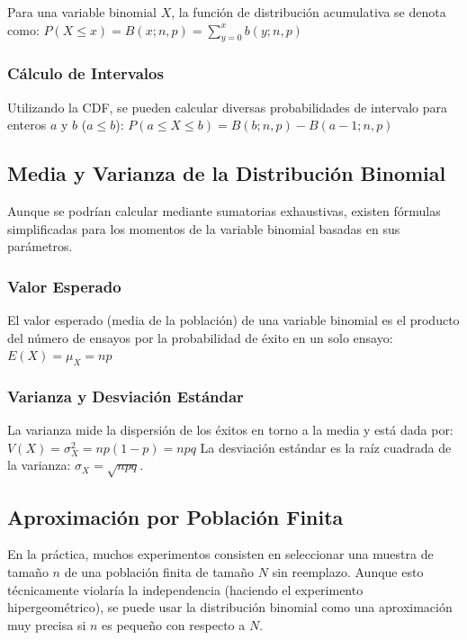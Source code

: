 \documentclass[a4paper]{article}
\begin{document}
Para una variable binomial $X$, la función de distribución acumulativa se denota como:
$P(X \leq x) = B(x; n, p) = \sum_{y=0}^{x} b(y; n, p)$

\subsubsection{Cálculo de Intervalos}

Utilizando la CDF, se pueden calcular diversas probabilidades de intervalo para enteros $a$ y $b$ ($a \leq b$):
$P(a \leq X \leq b) = B(b; n, p) - B(a - 1; n, p)$

\subsection{Media y Varianza de la Distribución Binomial}

Aunque se podrían calcular mediante sumatorias exhaustivas, existen fórmulas simplificadas para los momentos de la variable binomial basadas en sus parámetros.

\subsubsection{Valor Esperado}

El valor esperado (media de la población) de una variable binomial es el producto del número de ensayos por la probabilidad de éxito en un solo ensayo:
$E(X) = \mu_X = np$

\subsubsection{Varianza y Desviación Estándar}

La varianza mide la dispersión de los éxitos en torno a la media y está dada por:
$V(X) = \sigma^2_X = np(1 - p) = npq$
La desviación estándar es la raíz cuadrada de la varianza: $\sigma_X = \sqrt{npq}$.

\subsection{Aproximación por Población Finita}

En la práctica, muchos experimentos consisten en seleccionar una muestra de tamaño $n$ de una población finita de tamaño $N$ sin reemplazo. Aunque esto técnicamente violaría la independencia (haciendo el experimento hipergeométrico), se puede usar la distribución binomial como una aproximación muy precisa si $n$ es pequeño con respecto a $N$.
\end{document}
